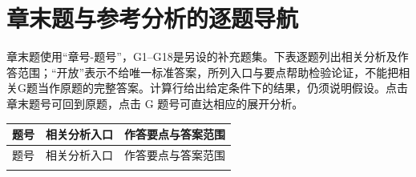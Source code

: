 \section{章末题与参考分析的逐题导航}
\label{sec:appG-map}

章末题使用“章号-题号”，G1--G18是另设的补充题集。下表逐题列出相关分析及作答范围；“开放”表示不给唯一标准答案，所列入口与要点帮助检验论证，不能把相关G题当作原题的完整答案。计算行给出给定条件下的结果，仍须说明假设。点击章末题号可回到原题，点击 G 题号可直达相应的展开分析。

\begin{small}
\setlength{\tabcolsep}{3pt}
\begin{longtable}{@{}p{1.1cm}p{4.1cm}p{10.1cm}@{}}
\toprule
题号 & 相关分析入口 & 作答要点与答案范围 \\
\midrule\endfirsthead
\toprule 题号 & 相关分析入口 & 作答要点与答案范围 \\\midrule\endhead
\bottomrule\endfoot


\end{longtable}
\end{small}
